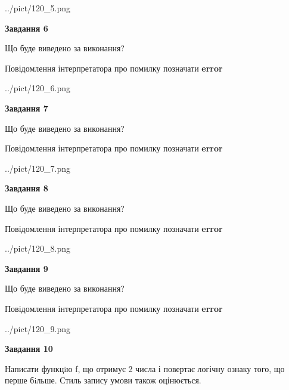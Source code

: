 \documentclass[12pt, ukrainian]{article}
\begin{document}
{\begin {large}
\begin{center}
	{../pict/120_5.png}
\end{center}
\newpage

{\begin {center}\textbf{Завдання 6}\end {center}}\par
Що буде виведено за виконання? \par
Повідомлення інтерпретатора про помилку позначати \textbf{error}

\begin{center}
	{../pict/120_6.png}
\end{center}
\newpage

{\begin {center}\textbf{Завдання 7}\end {center}}\par
Що буде виведено за виконання? \par
Повідомлення інтерпретатора про помилку позначати \textbf{error}

\begin{center}
	{../pict/120_7.png}
\end{center}
\newpage

{\begin {center}\textbf{Завдання 8}\end {center}}\par
Що буде виведено за виконання? \par
Повідомлення інтерпретатора про помилку позначати \textbf{error}

\begin{center}
	{../pict/120_8.png}
\end{center}
\newpage

{\begin {center}\textbf{Завдання 9}\end {center}}\par
Що буде виведено за виконання? \par
Повідомлення інтерпретатора про помилку позначати \textbf{error}

\begin{center}
	{../pict/120_9.png}
\end{center}
\newpage

{\begin {center}\textbf{Завдання 10}\end {center}}\par

Написати функцiю f, що отримує 2 числа і повертає логічну ознаку того, що перше бiльше. Стиль запису умови також оцінюється.\par
\newpage

\end {large}}
\end{document}
